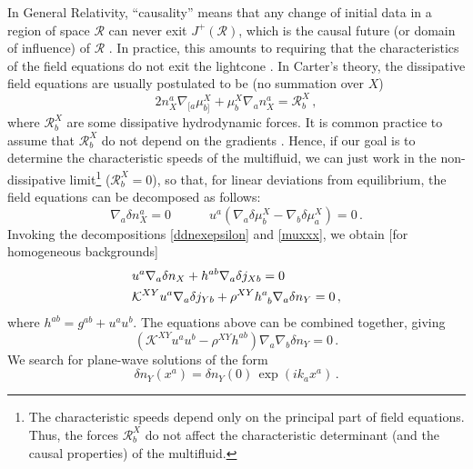 \documentclass[a4paper, amsfonts, amssymb, amsmath, reprint, showkeys, nofootinbib, twoside, onecolumn,notitlepage]{revtex4-1}
\newcommand{\spc}{\quad \quad \quad}
\theoremstyle{definition}
\theoremstyle{theorem}
\begin{document}
In General Relativity, ``causality'' means that any change of initial data in a region of space $\mathcal{R}$ can never exit $J^+(\mathcal{R})$, which is the causal future (or domain of influence) of $\mathcal{R}$ \cite{Wald,Hawking1973,BemficaCausality2018}. In practice, this amounts to requiring that the characteristics of the field equations do not exit the lightcone \cite{Susskind1969,Hishcock1983,BemficaDNDefinitivo2020}. 
In Carter's theory, the dissipative field equations are usually postulated to be (no summation over $X$)
\begin{equation}
2n_X^a \nabla_{[a} \mu^X_{b]} + \mu^X_b \nabla_a n_X^a =\mathcal{R}^X_b \, ,
\end{equation}
where $\mathcal{R}^X_b$ are some dissipative hydrodynamic forces. It is common practice to assume that $\mathcal{R}^X_b$ do not depend on the gradients \cite{GavassinoUEIT2021,GavassinoKhalatnikov2021}. Hence, if our goal is to determine the characteristic speeds of the multifluid, we can just work in the non-dissipative limit\footnote{The characteristic speeds depend only on the principal part of field equations. Thus, the forces $\mathcal{R}^X_b$ do not affect the characteristic determinant (and the causal properties) of the multifluid.} ($\mathcal{R}^X_b=0$), so that, for linear deviations from equilibrium, the field equations can be decomposed as follows:
\begin{equation}\label{menatana2}
\nabla_a \delta n_X^a=0  \spc u^a (\nabla_a \delta \mu^X_b -\nabla_b \delta \mu^X_a)=0 \, .
\end{equation}
Invoking the decompositions \eqref{ddnexepsilon} and \eqref{muxxx}, we obtain [for homogeneous backgrounds]
\begin{equation}\label{mentana}
\begin{split}
& u^a \nabla_a \delta n_X +h^{ab}\nabla_a \delta j_{Xb} =0\\
& \mathcal{K}^{XY} u^a \nabla_a \delta j_{Yb} + \rho^{XY} h\indices{^a _b} \nabla_a \delta n_Y =0 \, , \\
\end{split}
\end{equation}
where $h^{ab}=g^{ab}+u^a u^b$. The equations above can be combined together, giving 
\begin{equation}\label{gargantua}
(\mathcal{K}^{XY}u^a u^b - \rho^{XY} h^{ab})\nabla_a \nabla_b \delta n_Y =0 \, .
\end{equation}
We search for plane-wave solutions of the form
\begin{equation}\label{soundwave}
\delta n_Y(x^a)= \delta n_Y(0) \, \exp(ik_a x^a) \, .
\end{equation}
\end{document}
